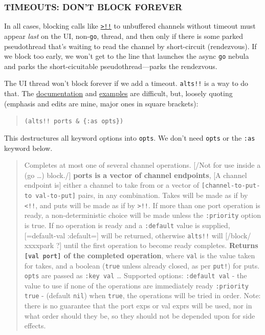\documentclass[10pt,oneside,x11names]{article}
\begin{document}
\subsubsection{TIMEOUTS: DON'T BLOCK FOREVER}
\label{timeouts-dont-block-forever}
In all cases, blocking calls like
\href{https://clojuredocs.org/clojure.core.async/>!!}{\texttt{>!!}} to
unbuffered channels without timeout must appear \emph{last} on the UI,
non-\texttt{go}, thread, and then only if there is some parked pseudothread
that's waiting to read the channel by short-circuit (rendezvous). If we
block too early, we won't get to the line that launches the async \texttt{go}
nebula and parks the short-cicuitable pseudothread---parks the
rendezvous.

The UI thread won't block forever if we add a timeout. \texttt{alts!!} is a way to do
that. The \href{https://clojuredocs.org/clojure.core.async/alts!!}{documentation} and \href{https://clojuredocs.org/clojure.core.async/alts!!}{examples} are difficult, but, loosely quoting
(emphasis and edits are mine, major ones in square brackets):

\begin{quote}
\texttt{(alts!! ports \& \{:as opts\})}
\end{quote}

This destructures all keyword options into \texttt{opts}. We don't need \texttt{opts} or
the \texttt{:as} keyword below.

\begin{quote}
Completes at most one of several channel operations. [/Not for use inside a
(go \ldots{}) block./] \textbf{ports is a vector of channel endpoints}, [A channel
endpoint is] either a channel to take from or a vector of \texttt{[channel-to-put-to
  val-to-put]} pairs, in any combination. Takes will be made as if by \texttt{<!!}, and
puts will be made as if by \texttt{>!!}. If more than one port operation is ready, a
non-deterministic choice will be made unless the \texttt{:priority} option is true.
If no operation is ready and a \texttt{:default} value is supplied, [=default-val
:default=] will be returned, otherwise \texttt{alts!!} will [/block/ xxxxpark ?]
until the first operation to become ready completes. \textbf{Returns \texttt{[val port]} of
the completed operation}, where \texttt{val} is the value taken for takes, and a
boolean (\texttt{true} unless already closed, as per \texttt{put!}) for puts. \texttt{opts} are
passed as \texttt{:key val} \ldots{} Supported options: \texttt{:default val} - the value to use
if none of the operations are immediately ready \texttt{:priority true} - (default
\texttt{nil}) when \texttt{true}, the operations will be tried in order. Note: there is no
guarantee that the port exps or val exprs will be used, nor in what order
should they be, so they should not be depended upon for side effects.
\end{quote}
\end{document}
